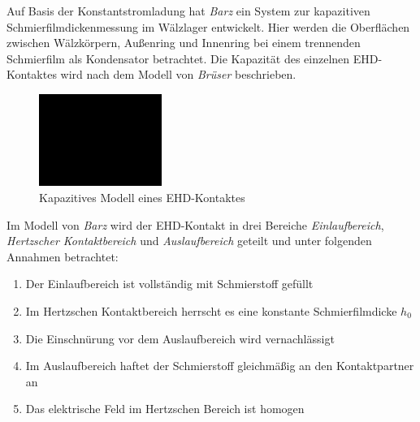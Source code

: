 Auf Basis der Konstantstromladung hat \textit{Barz} \cite{barz_1996} ein System zur kapazitiven Schmierfilmdickenmessung im Wälzlager entwickelt.
Hier werden die Oberflächen zwischen Wälzkörpern, Außenring und Innenring bei einem trennenden Schmierfilm als Kondensator betrachtet.
Die Kapazität des einzelnen EHD-Kontaktes wird nach dem Modell von \textit{Brüser} \cite{brueser_1972} beschrieben.
\begin{figure}[htb]
    \centering
    \includegraphics[width=4cm]{./images/blank_img.jpg}
    \caption{Kapazitives Modell eines EHD-Kontaktes \cite{barz_1996}}
    \label{fig:kapazitives_modell_eines_ehd_kontaktes}
\end{figure}
%

Im Modell von \textit{Barz} wird der EHD-Kontakt in drei Bereiche \textit{Einlaufbereich}, \textit{Hertzscher Kontaktbereich} und \textit{Auslaufbereich} geteilt und unter folgenden Annahmen betrachtet:
%
\begin{enumerate}
    \item Der Einlaufbereich ist vollständig mit Schmierstoff gefüllt
    \item Im Hertzschen Kontaktbereich herrscht es eine konstante Schmierfilmdicke $h_0$
    \item Die Einschnürung vor dem Auslaufbereich wird vernachlässigt
    \item Im Auslaufbereich haftet der Schmierstoff gleichmäßig an den Kontaktpartner an
    \item Das elektrische Feld im Hertzschen Bereich ist homogen
\end{enumerate}
%


